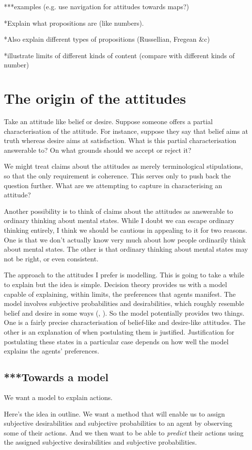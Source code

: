 \documentclass[12pt,\papersize]{extarticle}
\begin{document}
***examples (e.g. use navigation for attitudes towards maps?)

*Explain what propositions are (like numbers).  

*Also explain different types of propositions (Russellian, Fregean \&c)

*illustrate limits of different kinds of content (compare with different kinds of number)


\section{The origin of the attitudes}

Take an attitude like belief or desire.
Suppose someone offers a partial characterisation of the attitude.
For instance, 
suppose they say that belief aims at truth whereas desire aims at satisfaction.
What is this partial characterisation answerable to?
On what grounds should we accept or reject it?

We might treat claims about the attitudes as merely terminological stipulations, so that the only requirement is coherence.
This serves only to push back the question further.
What are we attempting to capture in characterising an attitude?  

Another possibility is to think of claims about the attitudes as answerable to ordinary thinking about mental states.
While I doubt we can escape ordinary thinking entirely, I think we should be cautious in appealing to it for two reasons.
One is that we don't actually know very much about how people ordinarily think about mental states.
The other is that ordinary thinking about mental states may not be right, or even consistent.

The approach to the attitudes I prefer is modelling.
This is going to take a while to explain but the idea is simple.
Decision theory provides us with a model capable of explaining, within limits, the preferences that agents manifest.
The model involves subjective probabilities and desirabilities, which roughly resemble belief and desire in some ways (\citealp[p.\ 59]{Jeffrey:1983oe}, \citealp{Davidson:1985qg}). 
So the model potentially provides two things.
One is a fairly precise characterisation of belief-like and desire-like attitudes.
The other is an explanation of when postulating them is justified.
Justification for postulating these states in a particular case depends on how well the model explains the agents' preferences.



\subsection{***Towards a model}
We want  a model to explain actions.

Here's the idea in outline.
We want a method that will enable us to assign subjective desirabilities and subjective probabilities to an agent by observing some of their actions.
And we then want to be able to \emph{predict} their actions using the assigned subjective desirabilities and subjective probabilities.





\small

\end{document}
